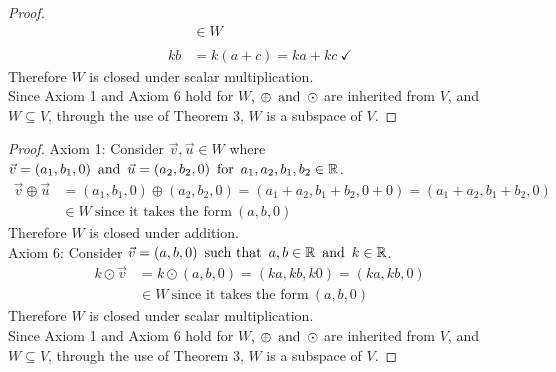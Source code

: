\documentclass{article}
\begin{document}
\begin{enumerate}
\begin{proof}
\begin{align*}
                            & \in W                                              \\ \\
            kb              & = k(a+c) = ka + kc~\checkmark
        \end{align*}
        Therefore $W$ is closed under scalar multiplication. \\
        Since Axiom 1 and Axiom 6 hold for $W$, $\oplus \operatorname{~\text{and}~} \odot$ are inherited from $V$, and $W \subseteq V$, through the use of Theorem 3, $W$ is a subspace of $V$.
    \end{proof}
    \begin{proof}
        Axiom 1: Consider $\vec{v},\vec{u} \in W$ where $\vec{v} = (a_1,b_1,0) \operatorname{~\text{and}~} \vec{u} = (a_2,b_2,0) \operatorname{~\text{for}~} a_1,a_2,b_1,b_2 \in \mathbb{R}$.
        \begin{align*}
            \vec{v} \oplus \vec{u} & = (a_1,b_1,0) \oplus (a_2,b_2,0) = (a_1+a_2,b_1+b_2,0+0) = (a_1+a_2,b_1+b_2,0) \\
                                   & \in W~\text{since it takes the form}~(a,b,0)
        \end{align*}
        Therefore $W$ is closed under addition. \\
        Axiom 6: Consider $\vec{v} = (a,b,0) \operatorname{~\text{such that}~} a,b \in \mathbb{R} \operatorname{~\text{and}~} k \in \mathbb{R}$.
        \begin{align*}
            k \odot \vec{v} & = k \odot (a,b,0) = (ka,kb,k0) = (ka,kb,0)   \\
                            & \in W~\text{since it takes the form}~(a,b,0)
        \end{align*}
        Therefore $W$ is closed under scalar multiplication. \\
        Since Axiom 1 and Axiom 6 hold for $W$, $\oplus \operatorname{~\text{and}~} \odot$ are inherited from $V$, and $W \subseteq V$, through the use of Theorem 3, $W$ is a subspace of $V$.
    \end{proof}
\end{enumerate}
\end{document}
